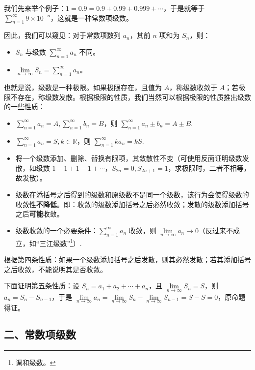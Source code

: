 \documentclass[b5paper]{ctexart}
\newcommand{\jst}{\sum \limits_{n = 1}^{\infty}}
\begin{document}
	我们先来举个例子：$1 = 0.\dot{9} = 0.9 + 0.99 + 0.999+ \cdots$，于是就等于 $\jst 9 \times 10^{-n}$，这就是一种常数项级数。
	
	因此，我们可以窥见：对于常数项数列 {$a_n$}，其前 $n$ 项和为 $S_n$，则：
	
	\begin{itemize}
		\item $S_n$ 与级数 $\jst a_n$ 不同。
		
		\item $\lim\limits_{n \to \infty} S_n = \jst a_n$。
	\end{itemize}
	
	也就是说，级数是一种极限。如果极限存在，且值为 $A$，称级数收敛于 $A$；若极限不存在，称级数发散。根据极限的性质，我们当然可以根据极限的性质推出级数的一些性质：
	
	\begin{itemize}
		\item $\jst a_n = A, \jst b_n = B$，则 $\jst a_n \pm b_n = A \pm B$.
		
		\item $\jst a_n = S, k \in \mathbb{R}$，则 $\jst k a_n = k S$.
		
		\item 将一个级数添加、删除、替换有限项，其敛散性不变（可使用反面证明级数发散，如级数 $1 - 1 + 1 - 1 + \cdots$，$S_{2n} = 0, S_{2n + 1} = 1$，求极限时，二者不相等，故发散）。
		
		\item 级数在添括号之后得到的级数和原级数不是同一个级数，该行为会使得级数的收敛性\textbf{不降低}。即：收敛的级数添加括号之后必然收敛；发散的级数添加括号之后\textbf{可能}收敛。
		
		\item 级数收敛的一个必要条件：$\jst a_n$ 收敛，则 $\lim\limits_{n \to \infty} a_n \to 0$（反过来不成立，如“三江级数”\footnote{调和级数。}）.
		
	\end{itemize}
	
	根据第四条性质：如果一个级数添加括号之后发散，则其必然发散；若其添加括号之后收敛，不能说明其是否收敛。
	
	下面证明第五条性质：设 $S_n = a_1 + a_2 + \cdots + a_n$，且 $\lim\limits_{n \to \infty} S_n = S$，则 $a_n = S_n - S_{n - 1}$，于是 $\lim\limits_{n \to \infty} a_n = \lim\limits_{n \to \infty} S_n - \lim\limits_{n \to \infty} S_{n - 1} = S - S = 0$，原命题得证。 
	
	
	
	\subsection*{二、常数项级数}
	
\end{document}
